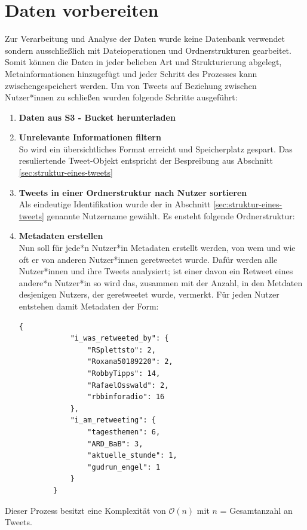 \section{Daten vorbereiten}
\label{sec:daten-vorbereiten}
Zur Verarbeitung und Analyse der Daten wurde keine Datenbank verwendet sondern ausschließlich mit Dateioperationen und Ordnerstrukturen gearbeitet. Somit können die Daten in jeder belieben Art und Strukturierung abgelegt, Metainformationen hinzugefügt und jeder Schritt des Prozesses kann zwischengespeichert werden. 
Um von Tweets auf Beziehung zwischen Nutzer*innen zu schließen wurden folgende Schritte ausgeführt:
\begin{enumerate}
	\item \textbf{Daten aus \gls{S3 - Bucket} herunterladen}
	\item \textbf{Unrelevante Informationen filtern}\\  So wird ein übersichtliches Format erreicht und Speicherplatz gespart. Das resuliertende Tweet-Objekt entspricht der Bespreibung aus Abschnitt \ref{sec:struktur-eines-tweets}
	\item \textbf{Tweets in einer Ordnerstruktur nach Nutzer sortieren\\} Als eindeutige Identifikation wurde der in Abschnitt \ref{sec:struktur-eines-tweets} genannte Nutzername gewählt. Es ensteht folgende Ordnerstruktur: \\

	\item \textbf{Metadaten erstellen}\\
	Nun soll für jede*n Nutzer*in Metadaten erstellt werden, von wem und wie oft er von anderen Nutzer*innen \gls{geretweetet} wurde.
	Dafür werden alle Nutzer*innen und ihre Tweets analysiert; ist einer davon ein \gls{Retweet} eines andere*n Nutzer*in so wird das, zusammen mit der Anzahl, in den Metdaten desjenigen Nutzers, der \gls{geretweetet} wurde, vermerkt. 
	Für jeden Nutzer entstehen damit Metadaten der Form:
	
	\begin{lstlisting}[caption={Metdaten des Nutzer: "`tagesschau"'}]
		{
			"i_was_retweeted_by": {
				"RSplettsto": 2,
				"Roxana50189220": 2,
				"RobbyTipps": 14,
				"RafaelOsswald": 2,
				"rbbinforadio": 16
			},
			"i_am_retweeting": {
				"tagesthemen": 6,
				"ARD_BaB": 3,
				"aktuelle_stunde": 1,
				"gudrun_engel": 1
			}
		}
	\end{lstlisting}
\end{enumerate}
Dieser Prozess besitzt eine Komplexität von $\mathcal{O}(n)$ mit $n$ = Gesamtanzahl an Tweets. 
